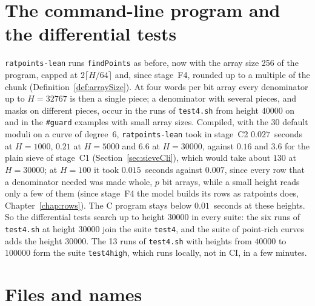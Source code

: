 \section{The command-line program and the differential tests}\label{sec:wordsCli}

\verb|ratpoints-lean| runs \verb|findPoints| as before, now with the array size 256 of the program,
capped at $2 \lceil H/64 \rceil$ and, since stage~F4, rounded up to a multiple of the chunk
(Definition~\ref{def:arraySize}). At four words per bit array every denominator up to $H = 32767$ is
then a single piece; a denominator with several pieces, and masks on different pieces, occur in the
runs of \verb|test4.sh| from height $40000$ on and in the \verb|#guard| examples with small array
sizes. Compiled, with the 30 default moduli on a curve of degree~$6$, \verb|ratpoints-lean| took in
stage~C2 $0.027$~seconds at $H = 1000$, $0.21$ at $H = 5000$ and $6.6$ at $H = 30000$, against
$0.16$ and $3.6$ for the plain sieve of stage~C1 (Section~\ref{sec:sieveCli}), which would take
about $130$ at $H = 30000$; at $H = 100$ it took $0.015$~seconds against $0.007$, since every row
that a denominator needed was made whole, $p$ bit arrays, while a small height reads only a few of
them (since stage~F4 the model builds its rows as ratpoints does, Chapter~\ref{chap:rows}). The C
program stays below $0.01$~seconds at these heights. So the differential tests search up to height
$30000$ in every suite: the six runs of \verb|test4.sh| at height $30000$ join the suite
\verb|test4|, and the suite of point-rich curves adds the height $30000$. The 13 runs of
\verb|test4.sh| with heights from $40000$ to $100000$ form the suite \verb|test4high|, which runs
locally, not in CI, in a few minutes.

\section{Files and names}


